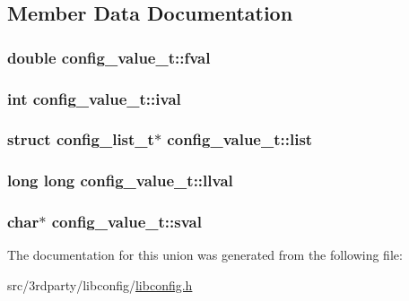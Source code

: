 \subsection{Member Data Documentation}
\hypertarget{unionconfig__value__t_a609c841d56ec29422ed61d12a90e7dfc}{
\subsubsection[{fval}]{\setlength{\rightskip}{0pt plus 5cm}double config\-\_\-value\-\_\-t\-::fval}}\label{unionconfig__value__t_a609c841d56ec29422ed61d12a90e7dfc}
\hypertarget{unionconfig__value__t_aa58090ef8528c7e35eb38c6ad23551e0}{
\subsubsection[{ival}]{\setlength{\rightskip}{0pt plus 5cm}int config\-\_\-value\-\_\-t\-::ival}}\label{unionconfig__value__t_aa58090ef8528c7e35eb38c6ad23551e0}
\hypertarget{unionconfig__value__t_a59f370b82f6ac0663825f8c90e12d63d}{
\subsubsection[{list}]{\setlength{\rightskip}{0pt plus 5cm}struct {\bf config\-\_\-list\-\_\-t}$\ast$ config\-\_\-value\-\_\-t\-::list}}\label{unionconfig__value__t_a59f370b82f6ac0663825f8c90e12d63d}
\hypertarget{unionconfig__value__t_ac375626c7fff331cf0d1e866b033f20a}{
\subsubsection[{llval}]{\setlength{\rightskip}{0pt plus 5cm}long long config\-\_\-value\-\_\-t\-::llval}}\label{unionconfig__value__t_ac375626c7fff331cf0d1e866b033f20a}
\hypertarget{unionconfig__value__t_a376d09b3da99952fcb1373b3574266ce}{
\subsubsection[{sval}]{\setlength{\rightskip}{0pt plus 5cm}char$\ast$ config\-\_\-value\-\_\-t\-::sval}}\label{unionconfig__value__t_a376d09b3da99952fcb1373b3574266ce}


The documentation for this union was generated from the following file\-:\begin{DoxyCompactItemize}
\item 
src/3rdparty/libconfig/\hyperlink{libconfig_8h}{libconfig.\-h}\end{DoxyCompactItemize}
